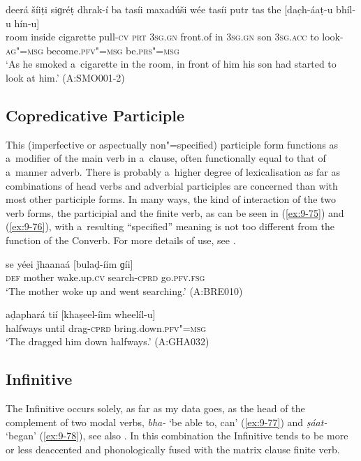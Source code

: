\begin{exe}
\ex
\label{ex:9-74}
\gll deerá šíiṭi siɡréṭ dhrak-í ba tasíi maxadúši wée tasíi putr tas the [dac̣h-áaṭ-u bhíl-u hín-u] \\
room inside cigarette pull-\textsc{cv} \textsc{prt} \textsc{3sg.gn} front.of in \textsc{3sg.gn} son \textsc{3sg.acc} to look-\textsc{ag"=msg} become.\textsc{pfv"=msg} be.\textsc{prs"=msg } \\
\glt `As he smoked a~cigarette in the room, in front of him his son had started to look at him.' (A:SMO001-2)
\end{exe}

\subsection{Copredicative Participle}
\label{subsec:9-3-5}

This (imperfective or aspectually non"=specified) participle form functions as a~modifier of the main verb in a~clause, often functionally equal to that of a~manner adverb. There is probably a~higher degree of lexicalisation as far as combinations of head verbs and adverbial participles are concerned than with most other participle forms. In many ways, the kind of interaction of the two verb forms, the participial and the finite verb, as can be seen in (\ref{ex:9-75}) and (\ref{ex:9-76}), with a~resulting ``specified'' meaning is not too different from the function of the Converb. For more details of use, see . 

\begin{exe}
\ex
\label{ex:9-75}
\gll se yéei ǰhaanaá [bulaḍ-íim ɡíi]  \\
\textsc{def} mother wake.up.\textsc{cv} search-\textsc{cprd} go.\textsc{pfv.fsg} \\
\glt `The mother woke up and went searching.' (A:BRE010)

\ex
\label{ex:9-76}
\gll aḍaphará tií [khaṣeel-íim wheelíl-u] \\
halfways until drag-\textsc{cprd} bring.down.\textsc{pfv"=msg} \\
\glt `The dragged him down halfways.' (A:GHA032)
\end{exe}

\subsection{Infinitive}
\label{subsec:9-3-6}

The Infinitive occurs solely, as far as my data goes, as the head of the complement of two modal
verbs, \textit{bha-} `be able to, can' (\ref{ex:9-77}) and \textit{ṣáat-} `began' (\ref{ex:9-78}), see also
. In this combination the Infinitive tends to be more or less deaccented and phonologically
fused with the matrix clause finite verb.

